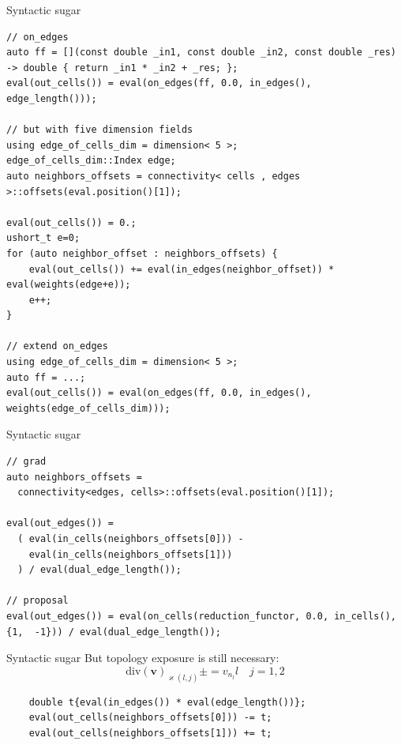 \documentclass{beamer}
\begin{document}
\begin{frame}[fragile]{Syntactic sugar}
  \begin{lstlisting}[basicstyle=\scriptsize\ttfamily]
// on_edges
auto ff = [](const double _in1, const double _in2, const double _res) -> double { return _in1 * _in2 + _res; };
eval(out_cells()) = eval(on_edges(ff, 0.0, in_edges(), edge_length()));

// but with five dimension fields
using edge_of_cells_dim = dimension< 5 >;
edge_of_cells_dim::Index edge;
auto neighbors_offsets = connectivity< cells , edges >::offsets(eval.position()[1]);

eval(out_cells()) = 0.;
ushort_t e=0;
for (auto neighbor_offset : neighbors_offsets) {
    eval(out_cells()) += eval(in_edges(neighbor_offset)) * eval(weights(edge+e));
    e++;
}

// extend on_edges
using edge_of_cells_dim = dimension< 5 >;
auto ff = ...;
eval(out_cells()) = eval(on_edges(ff, 0.0, in_edges(), weights(edge_of_cells_dim)));
  \end{lstlisting}

\end{frame}

\begin{frame}[fragile]{Syntactic sugar}
  \begin{lstlisting}[basicstyle=\scriptsize\ttfamily]
// grad
auto neighbors_offsets =
  connectivity<edges, cells>::offsets(eval.position()[1]);

eval(out_edges()) =
  ( eval(in_cells(neighbors_offsets[0])) -
    eval(in_cells(neighbors_offsets[1]))
  ) / eval(dual_edge_length());

// proposal
eval(out_edges()) = eval(on_cells(reduction_functor, 0.0, in_cells(), {1,  -1})) / eval(dual_edge_length());
  \end{lstlisting}
\end{frame}

\begin{frame}[fragile]{Syntactic sugar}
  But topology exposure is still necessary:
  \[\text{div}(\bm{v})_{\varkappa(l,j)} \pm = v_{n_l}l \quad j=1,2\]
  \begin{lstlisting}
    double t{eval(in_edges()) * eval(edge_length())};
    eval(out_cells(neighbors_offsets[0])) -= t;
    eval(out_cells(neighbors_offsets[1])) += t;
  \end{lstlisting}
\end{frame}
\end{document}

